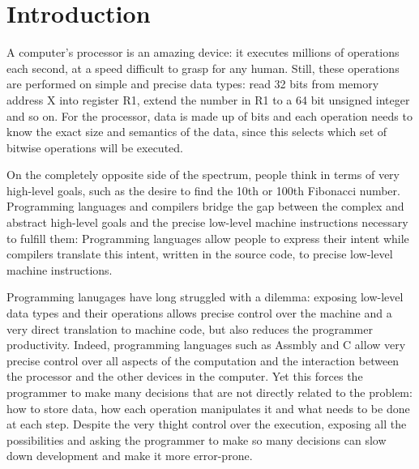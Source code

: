 \chapter{Introduction}

A computer's processor is an amazing device: it executes millions of operations each second, at a speed difficult to grasp for any human. Still, these operations are performed on simple and precise data types: read 32 bits from memory address X into register R1, extend the number in R1 to a 64 bit unsigned integer and so on. For the processor, data is made up of bits and each operation needs to know the exact size and semantics of the data, since this selects which set of bitwise operations will be executed.

On the completely opposite side of the spectrum, people think in terms of very high-level goals, such as the desire to find the 10th or 100th Fibonacci number. Programming languages and compilers bridge the gap between the complex and abstract high-level goals and the precise low-level machine instructions necessary to fulfill them: Programming languages allow people to express their intent while compilers translate this intent, written in the source code, to precise low-level machine instructions.

Programming lanugages have long struggled with a dilemma: exposing low-level data types and their operations allows precise control over the machine and a very direct translation to machine code, but also reduces the programmer productivity. Indeed, programming languages such as Assmbly and C allow very precise control over all aspects of the computation and the interaction between the processor and the other devices in the computer. Yet this forces the programmer to make many decisions that are not directly related to the problem: how to store data, how each operation manipulates it and what needs to be done at each step. Despite the very thight control over the execution, exposing all the possibilities and asking the programmer to make so many decisions can slow down  development and make it more error-prone.

